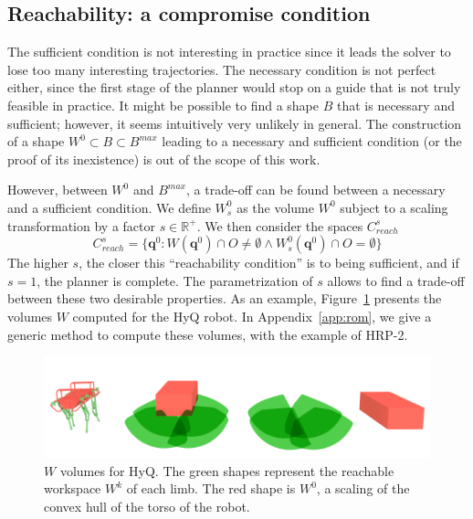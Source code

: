 \subsection{Reachability: a compromise condition}
The sufficient condition is not  interesting in practice since it leads the solver to lose too many interesting trajectories. The necessary condition is not perfect either, since the first stage of the planner would stop on a guide that is not truly feasible in practice. It might be possible to find a shape $B$ that is necessary and sufficient; however, it seems intuitively very unlikely in general. The construction of a shape $W^0 \subset B \subset B^{max}$ leading to a necessary and sufficient condition (or the proof of its inexistence) is out of the scope of this work.

However, between $W^0$ and $B^{max}$, a trade-off can be found between a necessary and a sufficient condition. We define $W^0_s$ as the volume $W^0$ subject to a scaling transformation by a factor $s \in \mathbb{R}^+$. 
%
We then consider the spaces $C_{reach}^s$
 \begin{equation}
C_{reach}^s = \{ \mathbf{q}^0 : W(\mathbf{q}^{0}) \cap O \neq \emptyset \wedge W^0_s(\mathbf{q}^{0}) \cap O = \emptyset \} %
\end{equation}
%
The higher $s$, the closer this ``reachability condition'' is to being sufficient, and if $s=1$, the planner is complete. The parametrization of $s$ allows to find a trade-off between these two desirable properties.
As an example, Figure~\ref{fig:hyq_roms} presents the volumes $W$ computed for the HyQ robot.
In Appendix~\ref{app:rom}, we give a generic method to compute these volumes, with the example of HRP-2.

\begin{figure}
  \centering
  \includegraphics[width=0.95\linewidth]{figures/hyq_roms}
  \caption{
           $W$ volumes for HyQ. The green shapes represent the reachable workspace $W^k$ of each limb. The red shape is $W^0$, a scaling of the convex hull
           of the torso of the robot.}
		   \label{fig:hyq_roms}
\end{figure}

